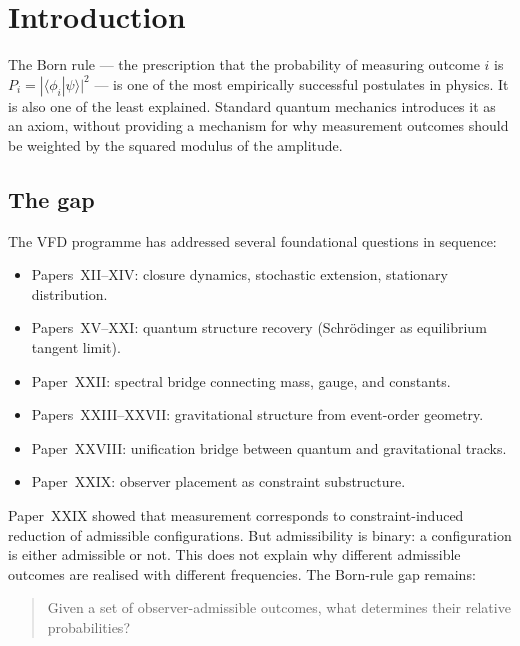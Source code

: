 \documentclass[12pt]{article}
\begin{document}
\section{Introduction}\label{sec:intro}

The Born rule --- the prescription that the probability of measuring outcome $i$ is $P_i = |\langle \phi_i | \psi \rangle|^2$ --- is one of the most empirically successful postulates in physics. It is also one of the least explained. Standard quantum mechanics introduces it as an axiom, without providing a mechanism for why measurement outcomes should be weighted by the squared modulus of the amplitude.

\subsection*{The gap}

The VFD programme has addressed several foundational questions in sequence:
\begin{itemize}
    \item Papers~XII--XIV: closure dynamics, stochastic extension, stationary distribution.
    \item Papers~XV--XXI: quantum structure recovery (Schr\"odinger as equilibrium tangent limit).
    \item Paper~XXII: spectral bridge connecting mass, gauge, and constants.
    \item Papers~XXIII--XXVII: gravitational structure from event-order geometry.
    \item Paper~XXVIII: unification bridge between quantum and gravitational tracks.
    \item Paper~XXIX: observer placement as constraint substructure.
\end{itemize}

Paper~XXIX showed that measurement corresponds to constraint-induced reduction of admissible configurations. But admissibility is binary: a configuration is either admissible or not. This does not explain why different admissible outcomes are realised with different frequencies. The Born-rule gap remains:

\begin{quote}
Given a set of observer-admissible outcomes, what determines their relative probabilities?
\end{quote}
\end{document}
